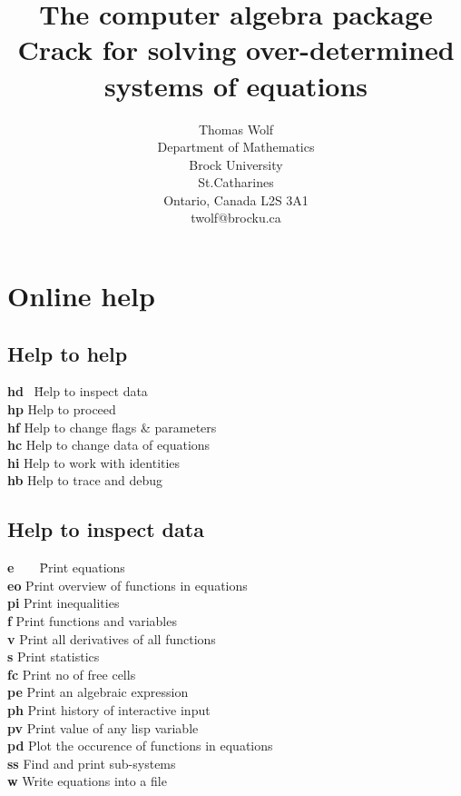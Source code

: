 \documentclass[12pt]{article}
\title{The computer algebra package {\sc Crack}
       for solving over-determined systems of equations}
\author{Thomas Wolf \\                        
        Department of Mathematics \\
        Brock University \\
        St.Catharines \\
        Ontario, Canada L2S 3A1 \\
        twolf@brocku.ca}
\begin{document}
\maketitle
\tableofcontents                                  
\section{Online help} 

\subsection{Help to help} 
\begin{tabbing}
  {\bf hd} \ \= Help to inspect data \\
  {\bf hp}   \> Help to proceed \\
  {\bf hf}   \> Help to change flags \& parameters \\
  {\bf hc}   \> Help to change data of equations \\
  {\bf hi}   \> Help to work with identities \\
  {\bf hb}   \> Help to trace and debug
\end{tabbing}

\subsection{Help to inspect data} 
\begin{tabbing}
  {\bf e}\ \ \ \ \= Print equations          \\
  {\bf eo}   \> Print overview of functions in equations  \\
  {\bf pi}   \> Print inequalities  \\ 
  {\bf f}    \> Print functions and variables        \\
  {\bf v}    \> Print all derivatives of all functions  \\
  {\bf s}    \> Print statistics                  \\
  {\bf fc}   \> Print no of free cells  \\
  {\bf pe}   \> Print an algebraic expression \\
  {\bf ph}   \> Print history of interactive input \\
  {\bf pv}   \> Print value of any lisp variable \\
  {\bf pd}   \> Plot the occurence of functions in equations \\
  {\bf ss}   \> Find and print sub-systems \\
  {\bf w}    \> Write equations into a file
\end{tabbing}
\end{document}
